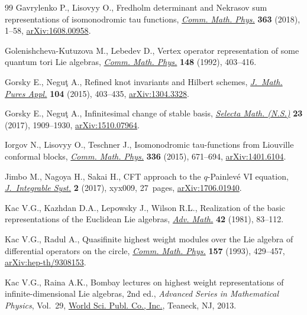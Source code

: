 \documentclass[pdftex]{sigma}
\numberwithin{equation}{section}
\theoremstyle{definition}
\begin{document}
\begin{thebibliography}{99}
Gavrylenko P., Lisovyy O., Fredholm determinant and {N}ekrasov sum
 representations of isomonodromic tau functions, \href{https://doi.org/10.1007/s00220-018-3224-7}{\textit{Comm. Math. Phys.}}
 \textbf{363} (2018), 1--58, \href{https://arxiv.org/abs/1608.00958}{arXiv:1608.00958}.

Golenishcheva-Kutuzova M., Lebedev D., Vertex operator representation of some
 quantum tori {L}ie algebras, \href{https://doi.org/10.1007/BF02100868}{\textit{Comm. Math. Phys.}} \textbf{148} (1992),
 403--416.

Gorsky E., Negu\c{t} A., Refined knot invariants and {H}ilbert schemes,
 \href{https://doi.org/10.1016/j.matpur.2015.03.003}{\textit{J.~Math. Pures Appl.}} \textbf{104} (2015), 403--435,
 \href{https://arxiv.org/abs/1304.3328}{arXiv:1304.3328}.

Gorsky E., Negu\c{t} A., Infinitesimal change of stable basis, \href{https://doi.org/10.1007/s00029-017-0327-5}{\textit{Selecta
 Math. (N.S.)}} \textbf{23} (2017), 1909--1930, \href{https://arxiv.org/abs/1510.07964}{arXiv:1510.07964}.

Iorgov N., Lisovyy O., Teschner J., Isomonodromic tau-functions from
 {L}iouville conformal blocks, \href{https://doi.org/10.1007/s00220-014-2245-0}{\textit{Comm. Math. Phys.}} \textbf{336} (2015),
 671--694, \href{https://arxiv.org/abs/1401.6104}{arXiv:1401.6104}.

Jimbo M., Nagoya H., Sakai H., C{FT} approach to the {$q$}-{P}ainlev\'e {VI}
 equation, \href{https://doi.org/10.1093/integr/xyx009}{\textit{J.~Integrable Syst.}} \textbf{2} (2017), xyx009, 27~pages,
 \href{https://arxiv.org/abs/1706.01940}{arXiv:1706.01940}.

Kac V.G., Kazhdan D.A., Lepowsky J., Wilson R.L., Realization of the basic
 representations of the {E}uclidean {L}ie algebras, \href{https://doi.org/10.1016/0001-8708(81)90053-0}{\textit{Adv. Math.}}
 \textbf{42} (1981), 83--112.

Kac V.G., Radul A., Quasifinite highest weight modules over the {L}ie algebra
 of differential operators on the circle, \href{https://doi.org/10.1007/BF02096878}{\textit{Comm. Math. Phys.}}
 \textbf{157} (1993), 429--457, \href{https://arxiv.org/abs/hep-th/9308153}{arXiv:hep-th/9308153}.

Kac V.G., Raina A.K., Bombay lectures on highest weight representations of
 infinite-dimensional {L}ie algebras, 2nd ed., \textit{Advanced Series in Mathematical
 Physics}, Vol.~29, \href{https://doi.org/10.1142/8882}{World Sci. Publ. Co., Inc.}, Teaneck, NJ, 2013.


\end{thebibliography}
\end{document}
